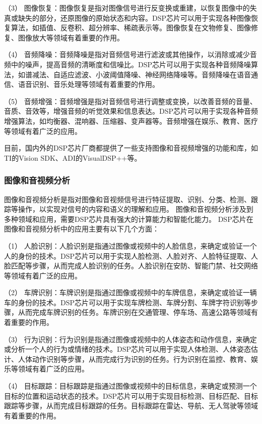 \documentclass{math201}
\begin{document}
（3） 图像恢复：图像恢复是指对图像信号进行反变换或重建，以恢复图像中的失真或缺失的部分，还原图像的原始状态和内容。DSP芯片可以用于实现各种图像恢复算法，如插值、反卷积、超分辨率、稀疏表示等。图像恢复在文物修复、图像修复、图像放大等领域有着重要的作用。

（4） 音频降噪：音频降噪是指对音频信号进行滤波或其他操作，以消除或减少音频中的噪声，提高音频的清晰度和信噪比。DSP芯片可以用于实现各种音频降噪算法，如谱减法、自适应滤波、小波阈值降噪、神经网络降噪等。音频降噪在语音通信、语音识别、音乐处理等领域有着重要的作用。

（5） 音频增强：音频增强是指对音频信号进行调整或变换，以改善音频的音量、音质、音效等，增强音频的听觉效果和信息表达。DSP芯片可以用于实现各种音频增强算法，如均衡器、混响器、压缩器、变声器等。音频增强在娱乐、教育、医疗等领域有着广泛的应用。

目前，国内外的DSP芯片厂商都提供了一些支持图像和音视频增强的功能和库，如TI的Vision SDK、ADI的VisualDSP++等。

\subsubsection{图像和音视频分析}

图像和音视频分析是指对图像和音视频信号进行特征提取、识别、分类、检测、跟踪等操作，以实现对信号的内容和语义的理解和应用。
图像和音视频分析涉及到多种领域和应用，需要DSP芯片具有强大的计算能力和智能化能力。
DSP芯片在图像和音视频分析中的应用主要有以下几个方面：

（1） 人脸识别：人脸识别是指通过图像或视频中的人脸信息，来确定或验证一个人的身份的技术。DSP芯片可以用于实现人脸检测、人脸对齐、人脸特征提取、人脸匹配等步骤，从而完成人脸识别的任务。人脸识别在安防、智能门禁、社交网络等领域有着广泛的应用。

（2） 车牌识别：车牌识别是指通过图像或视频中的车牌信息，来确定或验证一辆车的身份的技术。DSP芯片可以用于实现车牌检测、车牌分割、车牌字符识别等步骤，从而完成车牌识别的任务。车牌识别在交通管理、停车场、高速公路等领域有着重要的作用。

（3） 行为识别：行为识别是指通过图像或视频中的人体姿态和动作信息，来确定或分析一个人的行为或情绪的技术。DSP芯片可以用于实现人体检测、人体姿态估计、人体动作识别等步骤，从而完成行为识别的任务。行为识别在监控、教育、娱乐等领域有着广泛的应用。

（4） 目标跟踪：目标跟踪是指通过图像或视频中的目标信息，来确定或预测一个目标的位置和运动状态的技术。DSP芯片可以用于实现目标检测、目标匹配、目标跟踪等步骤，从而完成目标跟踪的任务。目标跟踪在雷达、导航、无人驾驶等领域有着重要的作用。
\end{document}
